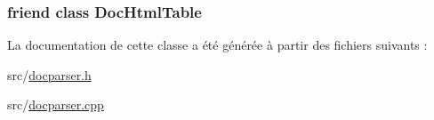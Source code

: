 \subsubsection[{Doc\+Html\+Table}]{\setlength{\rightskip}{0pt plus 5cm}friend class {\bf Doc\+Html\+Table}\hspace{0.3cm}{\ttfamily [friend]}}\label{class_doc_html_cell_a1f7413118a8c0d90c891a2695a7cb90d}


La documentation de cette classe a été générée à partir des fichiers suivants \+:\begin{DoxyCompactItemize}
\item 
src/\hyperlink{docparser_8h}{docparser.\+h}\item 
src/\hyperlink{docparser_8cpp}{docparser.\+cpp}\end{DoxyCompactItemize}
